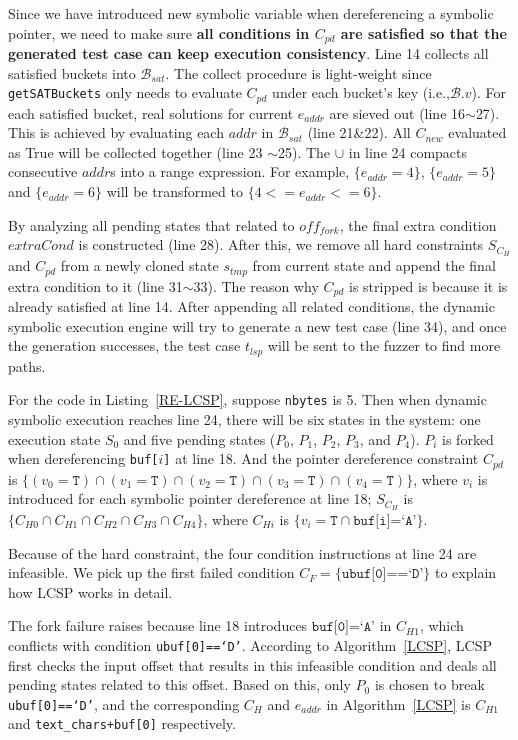 \documentclass{cta-author}
\begin{document}
Since we have introduced new symbolic variable when dereferencing a symbolic pointer,
we need to make sure \textbf{all conditions in $C_{pd}$ are satisfied so that the generated
test case can keep execution consistency}.
Line 14 collects all satisfied buckets into $\mathcal{B}_{sat}$. The collect procedure
is light-weight since \texttt{getSATBuckets} only needs to evaluate $C_{pd}$
under each bucket's key (i.e.,$\mathcal{B}.v$).
For each satisfied bucket, real solutions for current $e_{addr}$ are sieved out 
(line 16$\sim$27). This is achieved by evaluating each $addr$ in $\mathcal{B}_{sat}$
(line 21\&22). All $C_{new}$ evaluated as True will be collected together (line 23
$\sim$25). The $\cup$ in line 24 compacts consecutive $addr$s into a range expression.
For example, $\{e_{addr}=4\}$, $\{e_{addr}=5\}$ and $\{e_{addr}=6\}$ will be transformed to
$\{4<=e_{addr}<=6\}$.

By analyzing all pending states that related to $off_{fork}$, 
the final extra condition $extraCond$ is constructed (line 28).
After this, we remove all hard constraints $S_{C_H}$ and $C_{pd}$ from a newly cloned state $s_{tmp}$
from current state and append
the final extra condition to it (line 31$\sim$33). 
The reason why $C_{pd}$ is stripped is because it is already satisfied at line 14.
After appending all related conditions, the dynamic symbolic execution 
engine will try to generate a new test case (line 34), and once the 
generation successes, the test case $t_{lsp}$ will be sent to the 
fuzzer to find more paths.

For the code in Listing~\ref{RE-LCSP}, suppose \texttt{nbytes} is 5. 
Then when dynamic symbolic execution reaches line 24, there will be 
six states in the system: one execution state $S_0$ and five pending 
states ($P_0$, $P_1$, $P_2$, $P_3$, and $P_4$). $P_i$ is forked when 
dereferencing \texttt{buf[$i$]} at line 18. And the pointer dereference
constraint $C_{pd}$ is 
$\{(v_0=\texttt{T})\cap (v_1=\texttt{T})\cap (v_2=\texttt{T})\cap (v_3=\texttt{T})\cap (v_4=\texttt{T})\}$,
where $v_i$ is introduced for each symbolic pointer dereference at
line 18; $S_{C_H}$ is $\{C_{H0}\cap C_{H1}\cap C_{H2}\cap C_{H3}\cap C_{H4}\}$,
where $C_{Hi}$ is $\{v_i=\texttt{T}\cap \texttt{buf[i]=`A'}\}$.

Because of the hard constraint, the four condition instructions at line 24
are infeasible. We pick up the first failed condition 
$C_F=\{\texttt{ubuf[0]==`D'}\}$ to explain how LCSP works in detail.

The fork failure raises because line 18 introduces $\texttt{buf[0]=`A'}$ in $C_{H1}$, which conflicts with condition \texttt{ubuf[0]==`D'}. 
According to Algorithm~\ref{LCSP}, 
LCSP first checks the input offset that results in this infeasible
condition and deals all pending states related to this offset. 
Based on this,
only $P_0$ is chosen to break \texttt{ubuf[0]==`D'}, and the
corresponding $C_H$ and $e_{addr}$ in Algorithm~\ref{LCSP} is $C_{H1}$ and 
\texttt{text\_chars+buf[0]} respectively.
\end{document}
